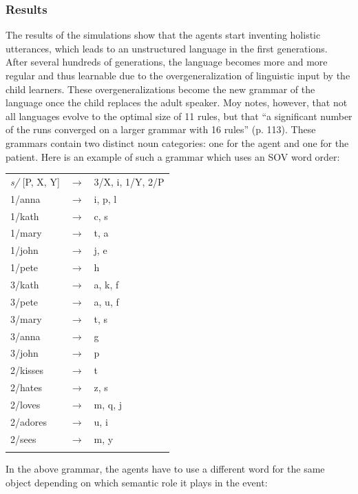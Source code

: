 \subsubsection{Results}
The results of the simulations show that the agents start inventing holistic utterances, which leads to an unstructured language in the first generations. After several hundreds of generations, the language becomes more and more regular and thus learnable due to the overgeneralization of linguistic input by the child learners. These overgeneralizations become the new grammar of the language once the child replaces the adult speaker. Moy notes, however, that not all languages evolve to the optimal size of 11 rules, but that  ``a significant number of the runs converged on a larger grammar with 16 rules''  (p. 113). These grammars contain two distinct noun categories: one for the agent and one for the patient. Here is an example of such a grammar which uses an SOV word order:

\ea
\label{g:moy-grammar}
\begin{tabular}{l c l}
{\em s/} [P, X, Y] & $\rightarrow$  & 3/X, i, 1/Y, 2/P
\\ 1/anna & $\rightarrow$ & i, p, l
\\ 1/kath & $\rightarrow$ & c, s
\\ 1/mary & $\rightarrow$ & t, a
\\ 1/john & $\rightarrow$ & j, e
\\ 1/pete & $\rightarrow$ & h
\\ 3/kath & $\rightarrow$ & a, k, f
\\ 3/pete & $\rightarrow$ & a, u, f
\\ 3/mary & $\rightarrow$ & t, s
\\ 3/anna & $\rightarrow$ & g
\\ 3/john & $\rightarrow$ & p
\\ 2/kisses & $\rightarrow$ & t
\\ 2/hates & $\rightarrow$ & z, s
\\ 2/loves & $\rightarrow$ & m, q, j
\\ 2/adores&  $\rightarrow$ & u, i
\\ 2/sees & $\rightarrow$ & m, y
\\ \citep[113]{moy06case}
\end{tabular}
\z

In the above grammar, the agents have to use a different word for the same object depending on which semantic role it plays in the event:

